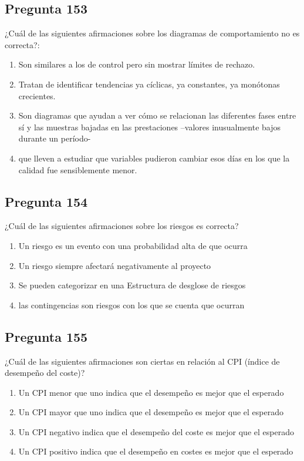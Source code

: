\documentclass[11pt,a4paper]{article}
\begin{document}
\subsection*{Pregunta 153}
¿Cuál de las siguientes afirmaciones sobre los diagramas de comportamiento no es correcta?:

\begin{enumerate}[label=\alph*)]
  \item Son similares a los de control pero sin mostrar límites de rechazo.
  \item Tratan de identificar tendencias ya cíclicas, ya constantes, ya monótonas crecientes.
  \item Son diagramas que ayudan a ver cómo se relacionan las diferentes fases entre sí y las muestras bajadas en las prestaciones –valores inusualmente bajos durante un período-
  \item que lleven a estudiar que variables pudieron cambiar esos días en los que la calidad fue sensiblemente menor.
\end{enumerate}

\subsection*{Pregunta 154}
¿Cuál de las siguientes afirmaciones sobre los riesgos es correcta?

\begin{enumerate}[label=\alph*)]
  \item Un riesgo es un evento con una probabilidad alta de que ocurra
  \item Un riesgo siempre afectará negativamente al proyecto
  \item Se pueden categorizar en una Estructura de desglose de riesgos
  \item las contingencias son riesgos con los que se cuenta que ocurran
\end{enumerate}

\subsection*{Pregunta 155}
¿Cuál de las siguientes afirmaciones son ciertas en relación al CPI (índice de desempeño del coste)?

\begin{enumerate}[label=\alph*)]
  \item Un CPI menor que uno indica que el desempeño es mejor que el esperado
  \item Un CPI mayor que uno indica que el desempeño es mejor que el esperado
  \item Un CPI negativo indica que el desempeño del coste es mejor que el esperado
  \item Un CPI positivo indica que el desempeño en costes es mejor que el esperado
\end{enumerate}
\end{document}
